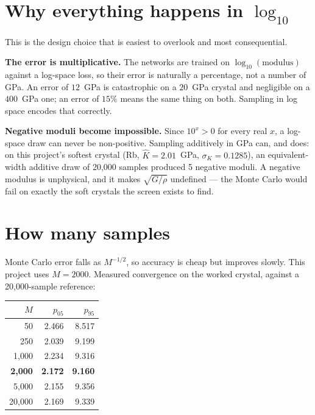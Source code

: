 \documentclass[11pt,a4paper]{article}
\begin{document}
\section{Why everything happens in $\log_{10}$}

This is the design choice that is easiest to overlook and most consequential.

\medskip
\noindent\textbf{The error is multiplicative.} The networks are trained on
$\log_{10}(\text{modulus})$ against a log-space loss, so their error is naturally a
percentage, not a number of GPa. An error of $12$~GPa is catastrophic on a $20$~GPa crystal
and negligible on a $400$~GPa one; an error of $15\%$ means the same thing on both.
Sampling in log space encodes that correctly.

\medskip
\noindent\textbf{Negative moduli become impossible.} Since $10^x > 0$ for every real $x$, a
log-space draw can never be non-positive. Sampling additively in GPa can, and does: on this
project's softest crystal (Rb, $\hat{K} = 2.01$~GPa, $\sigma_K = 0.1285$), an
equivalent-width additive draw of 20{,}000 samples produced 5 negative moduli. A negative
modulus is unphysical, and it makes $\sqrt{G/\rho}$ undefined --- the Monte Carlo would
fail on exactly the soft crystals the screen exists to find.

\section{How many samples}

Monte Carlo error falls as $M^{-1/2}$, so accuracy is cheap but improves slowly. This
project uses $M = 2000$. Measured convergence on the worked crystal, against a
20{,}000-sample reference:

\begin{center}
\begin{tabular}{@{}rrr@{}}
\toprule
$M$ & $p_{05}$ & $p_{95}$ \\
\midrule
50      & 2.466 & 8.517 \\
250     & 2.039 & 9.199 \\
1{,}000 & 2.234 & 9.316 \\
\textbf{2{,}000} & \textbf{2.172} & \textbf{9.160} \\
5{,}000 & 2.155 & 9.356 \\
20{,}000 & 2.169 & 9.339 \\
\bottomrule
\end{tabular}
\end{center}
\end{document}
